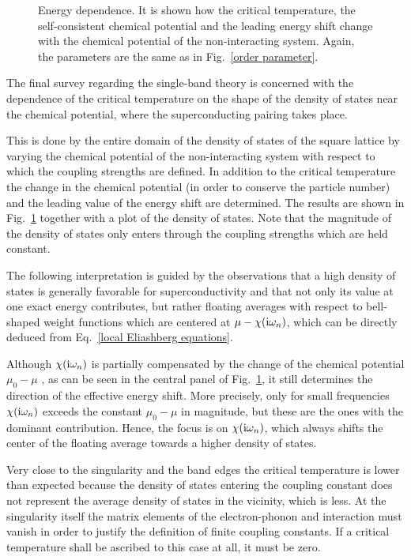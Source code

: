 \begin{figure}
    \small
    \centering
    
    
    
    \caption[Energy dependence]{
        Energy dependence. It is shown how the critical temperature, the
        self-consistent chemical potential and the leading energy shift change
        with the chemical potential of the non-interacting system. Again, the
        parameters are the same as in Fig.~\ref{order parameter}.}
    \label{energy dependence}
\end{figure}
%
The final survey regarding the single-band  theory is concerned
with the dependence of the critical temperature on the shape of the density of
states near the chemical potential, where the superconducting pairing takes
place.

This is done by  the entire domain of the density of states of the
square lattice by varying the chemical potential of the non-interacting system
with respect to which the coupling strengths are defined. In addition to the
critical temperature the change in the chemical potential (in order to conserve
the particle number) and the leading value of the energy shift are determined.
The results are shown in Fig.~\ref{energy dependence} together with a plot of
the density of states. Note that the magnitude of the density of states only
enters through the coupling strengths which are held constant.

The following interpretation is guided by the observations that a high density
of states is generally favorable for superconductivity and that not only its
value at one exact energy contributes, but rather floating averages with respect
to bell-shaped weight functions which are centered at $\mu - \chi(\mathrm i \omega_n)$,
which can be directly deduced from Eq.~\ref{local Eliashberg equations}.

Although $\chi(\mathrm i \omega_n)$ is partially compensated by the change of the
chemical potential $\mu_0 - \mu$ \cite[80]{AllenMitrovic82}, as can be seen in
the central panel of Fig.~\ref{energy dependence}, it still determines the
direction of the effective energy shift. More precisely, only for small
 frequencies $\chi(\mathrm i \omega_n)$ exceeds the constant $\mu_0 -
\mu$ in magnitude, but these are the ones with the dominant contribution. Hence,
the focus is on $\chi(\mathrm i \omega_n)$, which always shifts the center of the
floating average towards a higher density of states.

Very close to the  singularity and the band edges the critical
temperature is lower than expected because the density of states entering the
coupling constant does not represent the average density of states in the
vicinity, which is less. At the singularity itself the matrix elements of the
electron-phonon and  interaction must vanish in order to justify
the definition of finite coupling constants. If a critical temperature shall be
ascribed to this case at all, it must be zero.

